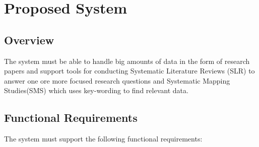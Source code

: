 \section{Proposed System}

\subsection{Overview}

The system must be able to handle big amounts of data in the form of research papers and support tools for conducting Systematic Literature Reviews (SLR) to answer one ore more focused research questions and Systematic Mapping Studies(SMS) which uses key-wording to find relevant data.

\subsection{Functional Requirements}
The system must support the following functional requirements:

